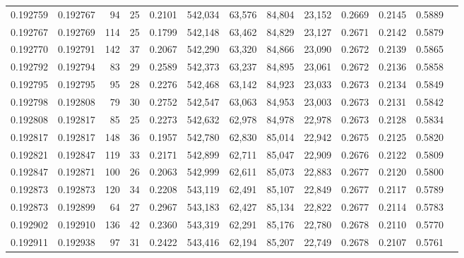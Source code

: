 \begin{tabular}{rrrrrrrrrrrrr}
0.192759 & 0.192767 &    94 &  25 &                                     0.2101 & 542,034 &  63,576 &  84,804 &  23,152 & 0.2669 & 0.2145 & 0.5889 \\
0.192767 & 0.192769 &   114 &  25 &                                     0.1799 & 542,148 &  63,462 &  84,829 &  23,127 & 0.2671 & 0.2142 & 0.5879 \\
0.192770 & 0.192791 &   142 &  37 &                                     0.2067 & 542,290 &  63,320 &  84,866 &  23,090 & 0.2672 & 0.2139 & 0.5865 \\
0.192792 & 0.192794 &    83 &  29 &                                     0.2589 & 542,373 &  63,237 &  84,895 &  23,061 & 0.2672 & 0.2136 & 0.5858 \\
0.192795 & 0.192795 &    95 &  28 &                                     0.2276 & 542,468 &  63,142 &  84,923 &  23,033 & 0.2673 & 0.2134 & 0.5849 \\
0.192798 & 0.192808 &    79 &  30 &                                     0.2752 & 542,547 &  63,063 &  84,953 &  23,003 & 0.2673 & 0.2131 & 0.5842 \\
0.192808 & 0.192817 &    85 &  25 &                                     0.2273 & 542,632 &  62,978 &  84,978 &  22,978 & 0.2673 & 0.2128 & 0.5834 \\
0.192817 & 0.192817 &   148 &  36 &                                     0.1957 & 542,780 &  62,830 &  85,014 &  22,942 & 0.2675 & 0.2125 & 0.5820 \\
0.192821 & 0.192847 &   119 &  33 &                                     0.2171 & 542,899 &  62,711 &  85,047 &  22,909 & 0.2676 & 0.2122 & 0.5809 \\
0.192847 & 0.192871 &   100 &  26 &                                     0.2063 & 542,999 &  62,611 &  85,073 &  22,883 & 0.2677 & 0.2120 & 0.5800 \\
0.192873 & 0.192873 &   120 &  34 &                                     0.2208 & 543,119 &  62,491 &  85,107 &  22,849 & 0.2677 & 0.2117 & 0.5789 \\
0.192873 & 0.192899 &    64 &  27 &                                     0.2967 & 543,183 &  62,427 &  85,134 &  22,822 & 0.2677 & 0.2114 & 0.5783 \\
0.192902 & 0.192910 &   136 &  42 &                                     0.2360 & 543,319 &  62,291 &  85,176 &  22,780 & 0.2678 & 0.2110 & 0.5770 \\
0.192911 & 0.192938 &    97 &  31 &                                     0.2422 & 543,416 &  62,194 &  85,207 &  22,749 & 0.2678 & 0.2107 & 0.5761 \\

\end{tabular}
